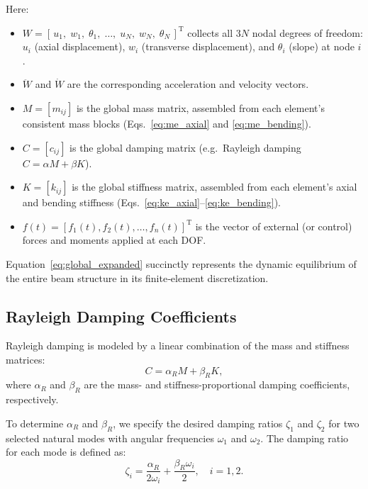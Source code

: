 \documentclass{article}
\begin{document}
	Here:
	\begin{itemize}
		\item \(W = [\,u_1,\;w_1,\;\theta_1,\;\dots,\;u_N,\;w_N,\;\theta_N\,]^\mathrm{T}\) collects all \(3N\) nodal degrees of freedom: 
		\(u_i\) (axial displacement), \(w_i\) (transverse displacement), and \(\theta_i\) (slope) at node \(i\).
		\item \(\ddot W\) and \(\dot W\) are the corresponding acceleration and velocity vectors.
		\item \(M = [m_{ij}]\) is the global mass matrix, assembled from each element’s consistent mass blocks (Eqs.~\eqref{eq:me_axial} and \eqref{eq:me_bending}).
		\item \(C = [c_{ij}]\) is the global damping matrix (e.g.\ Rayleigh damping \(C=\alpha M + \beta K\)).
		\item \(K = [k_{ij}]\) is the global stiffness matrix, assembled from each element’s axial and bending stiffness (Eqs.~\eqref{eq:ke_axial}–\eqref{eq:ke_bending}).
		\item \(f(t) = [f_1(t),f_2(t),\dots,f_n(t)]^\mathrm{T}\) is the vector of external (or control) forces and moments applied at each DOF.
	\end{itemize}
	
	Equation~\eqref{eq:global_expanded} succinctly represents the dynamic equilibrium of the entire beam structure in its finite‐element discretization.
	
	\subsection{Rayleigh Damping Coefficients}
	Rayleigh damping is modeled by a linear combination of the mass and stiffness matrices:
	\begin{equation}
		{C} = \alpha_R {M} + \beta_R {K},
	\end{equation}
	where \( \alpha_R \) and \( \beta_R \) are the mass- and stiffness-proportional damping coefficients, respectively.
	
	To determine \( \alpha_R \) and \( \beta_R \), we specify the desired damping ratios \( \zeta_1 \) and \( \zeta_2 \) for two selected natural modes with angular frequencies \( \omega_1 \) and \( \omega_2 \). The damping ratio for each mode is defined as:
	\begin{equation}
		\zeta_i = \frac{\alpha_R}{2\omega_i} + \frac{\beta_R \omega_i}{2}, \quad i = 1, 2.
	\end{equation}
	
\end{document}
